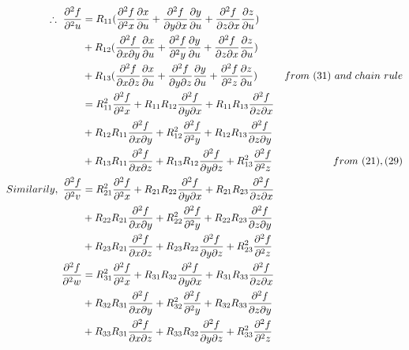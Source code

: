 \documentclass[a4paper,fleqn,11pt]{article}
\theoremstyle{mytheor}
\begin{document}
\begin{align}
\therefore\ \frac{\partial^2 f}{\partial^2 u} & =
R_{11}
(\frac{\partial^2 f}{\partial^2 x} \frac{\partial x}{\partial u} +
 \frac{\partial^2 f}{\partial y \partial x} \frac{\partial y}{\partial u} +
 \frac{\partial^2 f}{\partial z \partial x} \frac{\partial z}{\partial u})\notag \\
& + R_{12}(\frac{\partial^2 f}{\partial x \partial y} \frac{\partial x}{\partial u}
  + \frac{\partial^2 f}{\partial^2 y} \frac{\partial y}{\partial u}
  +	 \frac{\partial^2 f}{\partial z \partial x} \frac{\partial z}{\partial u}) \notag \\
& + R_{13}(\frac{\partial^2 f}{\partial x \partial z} \frac{\partial x}{\partial u}
  + \frac{\partial^2 f}{\partial y \partial z} \frac{\partial y}{\partial u} 
  +	 \frac{\partial^2 f}{\partial^2 z} \frac{\partial z}{\partial u}) & from\ (31)\ and\ chain\ rule \\
& = R_{11}^2\frac{\partial^2 f}{\partial^2 x} +
	R_{11}R_{12}\frac{\partial^2 f}{\partial y \partial x} +
	R_{11}R_{13}\frac{\partial^2 f}{\partial z \partial x}\notag \\
& + R_{12}R_{11}\frac{\partial^2 f}{\partial x \partial y} +
	R_{12}^2\frac{\partial^2 f}{\partial^2 y} +
	R_{12}R_{13}\frac{\partial^2 f}{\partial z \partial y}\notag \\
& + R_{13}R_{11}\frac{\partial^2 f}{\partial x \partial z} +
	R_{13}R_{12}\frac{\partial^2 f}{\partial y \partial z} +
	R_{13}^2\frac{\partial^2 f}{\partial^2 z} & from\ (21), (29) \\
Similarily,\ \frac{\partial^2 f}{\partial^2 v} & =
	R_{21}^2\frac{\partial^2 f}{\partial^2 x} +
	R_{21}R_{22}\frac{\partial^2 f}{\partial y \partial x} +
	R_{21}R_{23}\frac{\partial^2 f}{\partial z \partial x}\notag \\
& + R_{22}R_{21}\frac{\partial^2 f}{\partial x \partial y} +
	R_{22}^2\frac{\partial^2 f}{\partial^2 y} +
	R_{22}R_{23}\frac{\partial^2 f}{\partial z \partial y}\notag \\
& + R_{23}R_{21}\frac{\partial^2 f}{\partial x \partial z} +
	R_{23}R_{22}\frac{\partial^2 f}{\partial y \partial z} +
	R_{23}^2\frac{\partial^2 f}{\partial^2 z} \\
\frac{\partial^2 f}{\partial^2 w} & =
	R_{31}^2\frac{\partial^2 f}{\partial^2 x} +
	R_{31}R_{32}\frac{\partial^2 f}{\partial y \partial x} +
	R_{31}R_{33}\frac{\partial^2 f}{\partial z \partial x}\notag \\
& + R_{32}R_{31}\frac{\partial^2 f}{\partial x \partial y} +
	R_{32}^2\frac{\partial^2 f}{\partial^2 y} +
	R_{32}R_{33}\frac{\partial^2 f}{\partial z \partial y}\notag \\
& + R_{33}R_{31}\frac{\partial^2 f}{\partial x \partial z} +
	R_{33}R_{32}\frac{\partial^2 f}{\partial y \partial z} +
	R_{33}^2\frac{\partial^2 f}{\partial^2 z}
\end{align}
\end{document}
